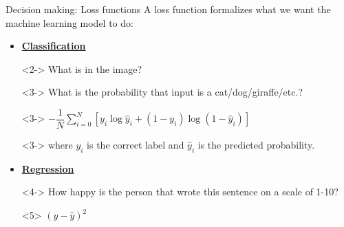 \documentclass[8pt]{beamer}
\begin{document}
	\begin{frame}[t]{Decision making: Loss functions}
		A loss function formalizes what we want the machine learning model to do:\\
		\begin{itemize}
			\item <2-> \textbf{\underline{Classification}}\\
			\item[] <2-> What is in the image?\\
			\item[\rightarrow] <3-> \hspace{0.2cm} What is the probability that input is a cat/dog/giraffe/etc.?
			\item[\rightarrow] <3-> \hspace{0.2cm} $-\dfrac{1}{N}\sum\limits_{i=0}^N \left[ y_i \log \hat{y}_i + (1 - y_i) \log (1 - \hat{y}_i) \right]$
			\item[] <3-> where $y_i$ is the correct label and $\hat{y}_i$ is the predicted probability.
			\item <4-> \textbf{\underline{Regression}}\\
			\item[] <4-> How happy is the person that wrote this sentence on a scale of 1-10?\\
			\item[\rightarrow] <5> \hspace{0.2cm} $\left(y - \hat{y}\right)^2$
		\end{itemize}
	\end{frame}
\end{document}
